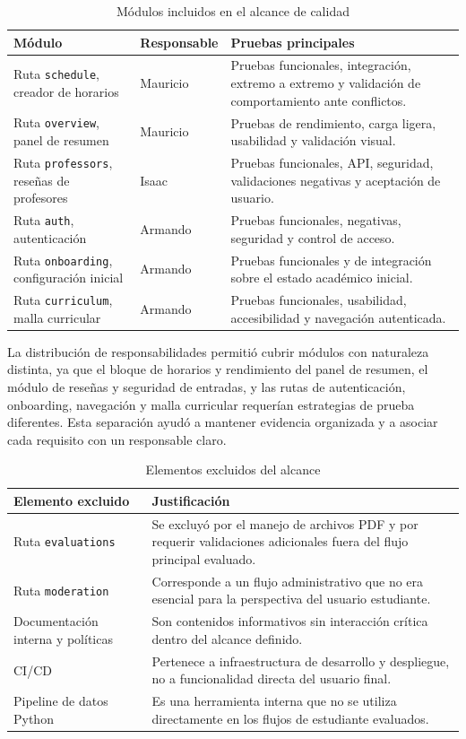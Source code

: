 \documentclass[11pt,spanish]{article}
\begin{document}
\begin{table}[H]
\centering
\caption{Módulos incluidos en el alcance de calidad}
\label{tab:alcance-incluido}
\begin{tabularx}{\textwidth}{p{4.2cm} p{2.8cm} Y}
\toprule
\textbf{Módulo} & \textbf{Responsable} & \textbf{Pruebas principales} \\
\midrule
Ruta \texttt{schedule}, creador de horarios & Mauricio & Pruebas funcionales, integración, extremo a extremo y validación de comportamiento ante conflictos. \\
Ruta \texttt{overview}, panel de resumen & Mauricio & Pruebas de rendimiento, carga ligera, usabilidad y validación visual. \\
Ruta \texttt{professors}, reseñas de profesores & Isaac & Pruebas funcionales, API, seguridad, validaciones negativas y aceptación de usuario. \\
Ruta \texttt{auth}, autenticación & Armando & Pruebas funcionales, negativas, seguridad y control de acceso. \\
Ruta \texttt{onboarding}, configuración inicial & Armando & Pruebas funcionales y de integración sobre el estado académico inicial. \\
Ruta \texttt{curriculum}, malla curricular & Armando & Pruebas funcionales, usabilidad, accesibilidad y navegación autenticada. \\
\bottomrule
\end{tabularx}
\end{table}

La distribución de responsabilidades permitió cubrir módulos con naturaleza distinta, ya que el bloque de horarios y rendimiento del panel de resumen, el módulo de reseñas y seguridad de entradas, y las rutas de autenticación, onboarding, navegación y malla curricular requerían estrategias de prueba diferentes. Esta separación ayudó a mantener evidencia organizada y a asociar cada requisito con un responsable claro.

\begin{table}[H]
\centering
\caption{Elementos excluidos del alcance}
\label{tab:alcance-excluido}
\begin{tabularx}{\textwidth}{p{4.5cm} Y}
\toprule
\textbf{Elemento excluido} & \textbf{Justificación} \\
\midrule
Ruta \texttt{evaluations} & Se excluyó por el manejo de archivos PDF y por requerir validaciones adicionales fuera del flujo principal evaluado. \\
Ruta \texttt{moderation} & Corresponde a un flujo administrativo que no era esencial para la perspectiva del usuario estudiante. \\
Documentación interna y políticas & Son contenidos informativos sin interacción crítica dentro del alcance definido. \\
CI/CD & Pertenece a infraestructura de desarrollo y despliegue, no a funcionalidad directa del usuario final. \\
Pipeline de datos Python & Es una herramienta interna que no se utiliza directamente en los flujos de estudiante evaluados. \\
\bottomrule
\end{tabularx}
\end{table}
\end{document}
